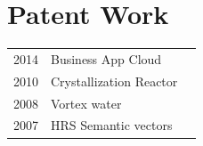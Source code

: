 \documentclass[letterpaper]{deedy-resume} %
\begin{document}
\begin{minipage}[t]{0.33\textwidth}

\section{Patent Work}

\begin{tabular}{rll}
2014 & Business App Cloud\\
2010 & Crystallization Reactor\\
2008 & Vortex water\\
2007 & HRS Semantic vectors\\
\end{tabular}


\end{minipage} %
\hfill
%
%
\end{document}
